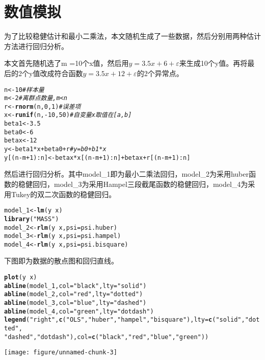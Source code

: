 \documentclass[english]{article}\usepackage[]{graphicx}\usepackage[]{color}
\makeatletter
\def\maxwidth{ %
  \ifdim\Gin@nat@width>\linewidth
    \linewidth
  \else
    \Gin@nat@width
  \fi
}
\newcommand{\hlstr}[1]{\textcolor[rgb]{0.192,0.494,0.8}{#1}}%
\newcommand{\hlcom}[1]{\textcolor[rgb]{0.678,0.584,0.686}{\textit{#1}}}%
\newcommand{\hlkwd}[1]{\textcolor[rgb]{0.737,0.353,0.396}{\textbf{#1}}}%
\newenvironment{kframe}{%
 \def\at@end@of@kframe{}%
 \ifinner\ifhmode%
  \def\at@end@of@kframe{\end{minipage}}%
  \begin{minipage}{\columnwidth}%
 \fi\fi%
 \def\FrameCommand##1{\hskip\@totalleftmargin \hskip-\fboxsep
 \colorbox{shadecolor}{##1}\hskip-\fboxsep
     \hskip-\linewidth \hskip-\@totalleftmargin \hskip\columnwidth}%
 \MakeFramed {\advance\hsize-\width
   \@totalleftmargin\z@ \linewidth\hsize
   \@setminipage}}%
 {\par\unskip\endMakeFramed%
 \at@end@of@kframe}
\newenvironment{knitrout}{}{} %
\makeatother
\begin{document}
\section{数值模拟}

为了比较稳健估计和最小二乘法，本文随机生成了一些数据，然后分别用两种估计方法进行回归分析。

本文首先随机选了m =10个x值，然后用$y=3.5x+6+\varepsilon$来生成10个y值。再将最后的2个y值改成符合函数$y=3.5x+12+\varepsilon$的2个异常点。

\begin{knitrout}
\color{fgcolor}\begin{kframe}
\begin{alltt}
n <- 10  \hlcom{# 样本量}
m <- 2  \hlcom{# 离群点数量,m<n}
r <- \hlkwd{rnorm}(n, 0, 1)  \hlcom{# 误差项}
x <- \hlkwd{runif}(n, -10, 50)  \hlcom{# 自变量x 取值在[a,b]}
beta1 <- 3.5
beta0 <- 6
betax <- 12
y <- beta1 * x + beta0 + r  \hlcom{#  y=b0+b1*x}
y[(n - m + 1):n] <- betax * x[(n - m + 1):n] + betax + r[(n - m + 1):n]
\end{alltt}
\end{kframe}
\end{knitrout}


然后进行回归分析。其中model\_1即为最小二乘法回归，model\_2为采用huber函数的稳健回归，model\_3为采用Hampel三段截尾函数的稳健回归，model\_4为采用Tukey的双二次函数的稳健回归。

\begin{knitrout}
\color{fgcolor}\begin{kframe}
\begin{alltt}
model_1 <- \hlkwd{lm}(y ~ x)
\hlkwd{library}(\hlstr{"MASS"})
model_2 <- \hlkwd{rlm}(y ~ x, psi = psi.huber)
model_3 <- \hlkwd{rlm}(y ~ x, psi = psi.hampel)
model_4 <- \hlkwd{rlm}(y ~ x, psi = psi.bisquare)
\end{alltt}
\end{kframe}
\end{knitrout}


下图即为数据的散点图和回归直线。

\begin{knitrout}
\color{fgcolor}\begin{kframe}
\begin{alltt}
\hlkwd{plot}(y ~ x)
\hlkwd{abline}(model_1, col = \hlstr{"black"}, lty = \hlstr{"solid"})
\hlkwd{abline}(model_2, col = \hlstr{"red"}, lty = \hlstr{"dotted"})
\hlkwd{abline}(model_3, col = \hlstr{"blue"}, lty = \hlstr{"dashed"})
\hlkwd{abline}(model_4, col = \hlstr{"green"}, lty = \hlstr{"dotdash"})
\hlkwd{legend}(\hlstr{"right"}, \hlkwd{c}(\hlstr{"OLS"}, \hlstr{"huber"}, \hlstr{"hampel"}, \hlstr{"bisquare"}), lty = \hlkwd{c}(\hlstr{"solid"}, \hlstr{"dotted"}, 
    \hlstr{"dashed"}, \hlstr{"dotdash"}), col = \hlkwd{c}(\hlstr{"black"}, \hlstr{"red"}, \hlstr{"blue"}, \hlstr{"green"}))
\end{alltt}
\end{kframe}
\texttt{[image: figure/unnamed-chunk-3]} 

\end{knitrout}
\end{document}
